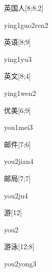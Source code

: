 \begin{verbete}{英国人}[8;8;2]
\begin{pronuncia}{ying1guo2ren2}
\end{pronuncia}
\end{verbete}

\begin{verbete}[ying1yu3]{英语}[8;9]
\begin{pronuncia}{ying1yu3}
\end{pronuncia}
\end{verbete}

\begin{verbete}{英文}[8;4]
\begin{pronuncia}{ying1wen2}
\end{pronuncia}
\end{verbete}

\begin{verbete}{优美}[6;9]
\begin{pronuncia}{you1mei3}
\end{pronuncia}
\end{verbete}

\begin{verbete}{邮件}[7;6]
\begin{pronuncia}{you2jian4}
\end{pronuncia}
\end{verbete}

\begin{verbete}[you2ju4]{邮局}[7;7]
\begin{pronuncia}{you2ju4}
\end{pronuncia}
\end{verbete}

\begin{verbete}[you2]{游}[12]
\begin{pronuncia}{you2}
\end{pronuncia}
\end{verbete}

\begin{verbete}{游泳}[12;8]
\begin{pronuncia}{you2yong3}
\end{pronuncia}
\end{verbete}

